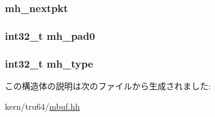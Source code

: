\label{structtru64_1_1m__hdr_ad797243dd78f7061d25a709ecdbf2bb5}
\hypertarget{structtru64_1_1m__hdr_a556f71f4c34489f582b42c8bc09615c3}{
\subsubsection[{mh\_\-nextpkt}]{ {\bf mh\_\-nextpkt}}}
\label{structtru64_1_1m__hdr_a556f71f4c34489f582b42c8bc09615c3}
\hypertarget{structtru64_1_1m__hdr_a06dec93c11e6b3e4cfe5f8186b670cb8}{
\subsubsection[{mh\_\-pad0}]{\setlength{\rightskip}{0pt plus 5cm}int32\_\-t {\bf mh\_\-pad0}}}
\label{structtru64_1_1m__hdr_a06dec93c11e6b3e4cfe5f8186b670cb8}
\hypertarget{structtru64_1_1m__hdr_a94275c0b9ce632d976cc995faf5a3b47}{
\subsubsection[{mh\_\-type}]{\setlength{\rightskip}{0pt plus 5cm}int32\_\-t {\bf mh\_\-type}}}
\label{structtru64_1_1m__hdr_a94275c0b9ce632d976cc995faf5a3b47}


この構造体の説明は次のファイルから生成されました:\begin{DoxyCompactItemize}
\item 
kern/tru64/\hyperlink{mbuf_8hh}{mbuf.hh}\end{DoxyCompactItemize}
